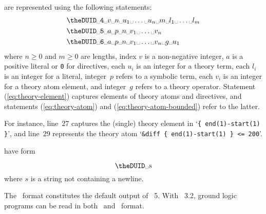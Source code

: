  are represented using the following statements:
\begin{align}
\texttt{\theDUID} \Space \texttt{4} & \Space v \Space n \Space u_1 \Space \dots \Space u_n \Space m \Space l_1 \Space \dots \Space l_m \label{eq:theory-element}\\
\texttt{\theDUID} \Space \texttt{5} & \Space a \Space p \Space n \Space v_1 \Space \dots \Space v_n \label{eq:theory-atom}\\
\texttt{\theDUID} \Space \texttt{6} & \Space a \Space p \Space n \Space v_1 \Space \dots \Space v_n \Space g \Space u_1 \label{eq:theory-atom-bounded}
\end{align}
where
$n \geq 0$ and $m \geq 0$ are lengths,
index $v$ is a non-negative integer,
$a$ is a positive literal or \texttt{0} for directives,
each $u_i$ is an integer for a theory term,
each $l_i$ is an integer for a literal,
integer~$p$ refers to a symbolic term,
each $v_i$ is an integer for a theory atom element, and
integer~$g$ refers to a theory operator.
%
Statement (\ref{eq:theory-element}) captures elements of theory atoms and directives, and
statements (\ref{eq:theory-atom}) and (\ref{eq:theory-atom-bounded}) refer to the latter.

For instance,
line~27 captures the (single) theory element  in `\lstinline+{ end(1)-start(1) }+',
and
line~29 represents the theory atom `\lstinline[morekeywords={&diff},alsoletter={\&}]+&diff { end(1)-start(1) } <= 200+'.

 have form
\addtocounter{DUID}{1}
\[\texttt{\theDUID} \Space s\]
where $s$ is a string not containing a newline.

The \aspif\ format constitutes the default output of \gringo~5.
With \clasp~3.2,
ground logic programs can be read in both \smodels\ and \aspif\ format.
